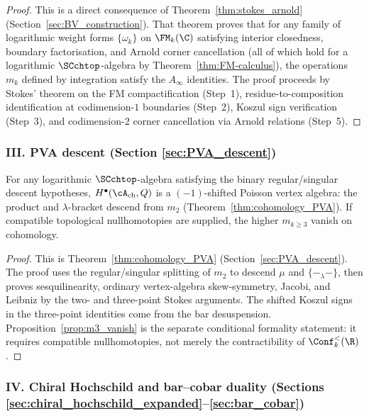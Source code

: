 \begin{proof}
This is a direct consequence of Theorem~\ref{thm:stokes_arnold} (Section~\ref{sec:BV_construction}). That theorem proves that for any family of logarithmic weight forms $\{\omega_k\}$ on $\FM_k(\C)$ satisfying interior closedness, boundary factorisation, and Arnold corner cancellation (all of which hold for a logarithmic $\SCchtop$-algebra by Theorem~\ref{thm:FM-calculus}), the operations $m_k$ defined by integration satisfy the $A_\infty$ identities. The proof proceeds by Stokes' theorem on the FM compactification (Step~1), residue-to-composition identification at codimension-$1$ boundaries (Step~2), Koszul sign verification (Step~3), and codimension-$2$ corner cancellation via Arnold relations (Step~5).
\end{proof}

\subsubsection*{III. PVA descent (Section \ref{sec:PVA_descent})}

\begin{theorem}
\label{thm:PVA-descent-roadmap}
For any logarithmic $\SCchtop$-algebra satisfying the binary
regular/singular descent hypotheses, $H^\bullet(\cA_{\mathrm{ch}},Q)$
is a $(-1)$-shifted Poisson vertex algebra: the product and
$\lambda$-bracket descend from $m_2$ (Theorem~\ref{thm:cohomology_PVA}).
If compatible topological nullhomotopies are supplied, the higher
$m_{k \geq 3}$ vanish on cohomology.
\end{theorem}

\begin{proof}
This is Theorem~\ref{thm:cohomology_PVA}
(Section~\ref{sec:PVA_descent}). The proof uses the regular/singular
splitting of $m_2$ to descend $\mu$ and $\{-{}_\lambda-\}$, then proves
sesquilinearity, ordinary vertex-algebra skew-symmetry, Jacobi, and
Leibniz by the two- and three-point Stokes arguments. The shifted
Koszul signs in the three-point identities come from the bar
desuspension. Proposition~\ref{prop:m3_vanish} is the separate
conditional formality statement: it requires compatible
nullhomotopies, not merely the contractibility of
$\Conf_k^{<}(\R)$.
\end{proof}

\subsubsection*{IV. Chiral Hochschild and bar--cobar duality (Sections \ref{sec:chiral_hochschild_expanded}--\ref{sec:bar_cobar})}

